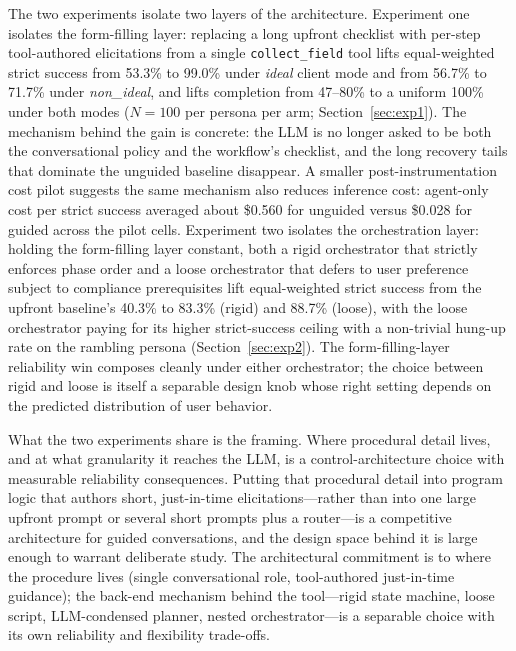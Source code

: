 \documentclass[11pt,a4paper]{article}
\newcommand{\rerunPlaceholderN}{100}
\begin{document}
The two experiments isolate two layers of the architecture. Experiment one isolates the form-filling layer: replacing a long upfront checklist with per-step tool-authored elicitations from a single \texttt{collect\_field} tool lifts equal-weighted strict success from 53.3\% to 99.0\% under \emph{ideal} client mode and from 56.7\% to 71.7\% under \emph{non\_ideal}, and lifts completion from 47--80\% to a uniform 100\% under both modes ($N=\rerunPlaceholderN$ per persona per arm; Section~\ref{sec:exp1}). The mechanism behind the gain is concrete: the LLM is no longer asked to be both the conversational policy and the workflow's checklist, and the long recovery tails that dominate the unguided baseline disappear. A smaller post-instrumentation cost pilot suggests the same mechanism also reduces inference cost: agent-only cost per strict success averaged about \$0.560 for unguided versus \$0.028 for guided across the pilot cells. Experiment two isolates the orchestration layer: holding the form-filling layer constant, both a rigid orchestrator that strictly enforces phase order and a loose orchestrator that defers to user preference subject to compliance prerequisites lift equal-weighted strict success from the upfront baseline's 40.3\% to 83.3\% (rigid) and 88.7\% (loose), with the loose orchestrator paying for its higher strict-success ceiling with a non-trivial hung-up rate on the rambling persona (Section~\ref{sec:exp2}). The form-filling-layer reliability win composes cleanly under either orchestrator; the choice between rigid and loose is itself a separable design knob whose right setting depends on the predicted distribution of user behavior.

What the two experiments share is the framing. Where procedural detail lives, and at what granularity it reaches the LLM, is a control-architecture choice with measurable reliability consequences. Putting that procedural detail into program logic that authors short, just-in-time elicitations---rather than into one large upfront prompt or several short prompts plus a router---is a competitive architecture for guided conversations, and the design space behind it is large enough to warrant deliberate study. The architectural commitment is to where the procedure lives (single conversational role, tool-authored just-in-time guidance); the back-end mechanism behind the tool---rigid state machine, loose script, LLM-condensed planner, nested orchestrator---is a separable choice with its own reliability and flexibility trade-offs.

\appendix
\end{document}

